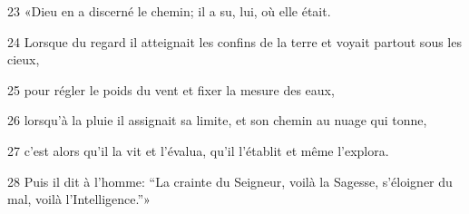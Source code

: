 
23 «Dieu en a discerné le chemin; il a su, lui, où elle était.

24 Lorsque du regard il atteignait les confins de la terre et voyait partout sous les cieux,

25 pour régler le poids du vent et fixer la mesure des eaux,

26 lorsqu’à la pluie il assignait sa limite, et son chemin au nuage qui tonne,

27 c’est alors qu’il la vit et l’évalua, qu’il l’établit et même l’explora.

28 Puis il dit à l’homme: “La crainte du Seigneur, voilà la Sagesse, s’éloigner du mal, voilà l’Intelligence.”»